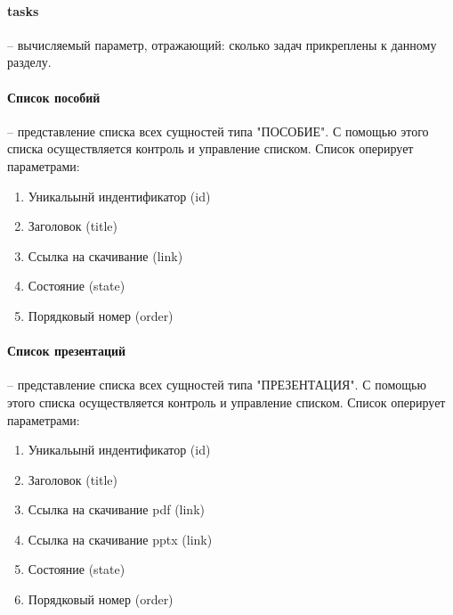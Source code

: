 \paragraph{tasks} -- вычисляемый параметр, отражающий: сколько задач прикреплены к данному разделу.

\paragraph{Список пособий} -- представление списка всех сущностей типа "ПОСОБИЕ". С помощью этого списка осуществляется контроль и управление списком.
Список оперирует параметрами:
\begin{enumerate}
  \item Уникальынй индентификатор (id)
  \item Заголовок (title)
  \item Ссылка на скачивание (link)
  \item Состояние (state)
  \item Порядковый номер (order)
\end{enumerate}

\paragraph{Список презентаций} -- представление списка всех сущностей типа "ПРЕЗЕНТАЦИЯ". С помощью этого списка осуществляется контроль и управление списком.
Список оперирует параметрами:
\begin{enumerate}
  \item Уникальынй индентификатор (id)
  \item Заголовок (title)
  \item Ссылка на скачивание pdf (link)
  \item Ссылка на скачивание pptx (link)
  \item Состояние (state)
  \item Порядковый номер (order)
\end{enumerate}
